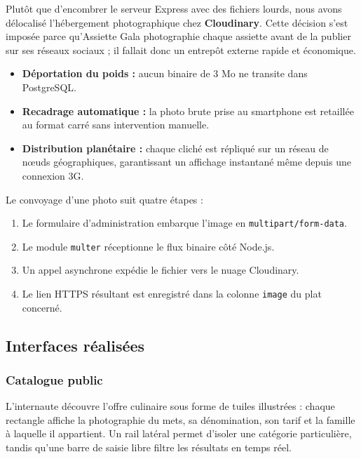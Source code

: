Plutôt que d'encombrer le serveur Express avec des fichiers lourds, nous avons délocalisé l'hébergement photographique chez \textbf{Cloudinary}. Cette décision s'est imposée parce qu'Assiette Gala photographie chaque assiette avant de la publier sur ses réseaux sociaux ; il fallait donc un entrepôt externe rapide et économique.

\begin{itemize}
    \item \textbf{Déportation du poids :} aucun binaire de 3 Mo ne transite dans PostgreSQL.
    \item \textbf{Recadrage automatique :} la photo brute prise au smartphone est retaillée au format carré sans intervention manuelle.
    \item \textbf{Distribution planétaire :} chaque cliché est répliqué sur un réseau de n\oe{}uds géographiques, garantissant un affichage instantané même depuis une connexion 3G.
\end{itemize}

Le convoyage d'une photo suit quatre étapes :
\begin{enumerate}
    \item Le formulaire d'administration embarque l'image en \texttt{multipart/form-data}.
    \item Le module \texttt{multer} réceptionne le flux binaire côté Node.js.
    \item Un appel asynchrone expédie le fichier vers le nuage Cloudinary.
    \item Le lien HTTPS résultant est enregistré dans la colonne \texttt{image} du plat concerné.
\end{enumerate}

\subsection{Interfaces réalisées}

\subsubsection{Catalogue public}


L'internaute découvre l'offre culinaire sous forme de tuiles illustrées : chaque rectangle affiche la photographie du mets, sa dénomination, son tarif et la famille à laquelle il appartient. Un rail latéral permet d'isoler une catégorie particulière, tandis qu'une barre de saisie libre filtre les résultats en temps réel.

